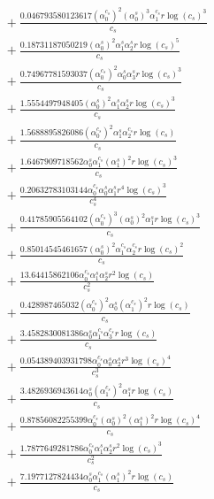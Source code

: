 \documentclass[10pt]{article}
\begin{document}
\begin{align*}
&{}  + \frac{0.046793580123617 \left(\alpha_{0}^{c_s}\right)^{2} \left(\alpha_{0}^s\right)^{3} \alpha_{1}^{c_s} r \log{\left(c_{s} \right)}^{3}}{c_{s}} \\
&{}  + \frac{0.18731187050219 \left(\alpha_{0}^s\right)^{2} \alpha_{1}^s \alpha_{2}^s r \log{\left(c_{s} \right)}^{5}}{c_{s}} \\
&{}  + \frac{0.74967781593037 \left(\alpha_{0}^{c_s}\right)^{2} \alpha_{0}^s \alpha_{3}^s r \log{\left(c_{s} \right)}^{3}}{c_{s}} \\
&{}  + \frac{1.5554497948405 \left(\alpha_{0}^s\right)^{2} \alpha_{1}^s \alpha_{2}^s r \log{\left(c_{s} \right)}^{3}}{c_{s}} \\
&{}  + \frac{1.5688895826086 \left(\alpha_{0}^{c_s}\right)^{2} \alpha_{1}^s \alpha_{2}^{c_s} r \log{\left(c_{s} \right)}}{c_{s}} \\
&{}  + \frac{1.6467909718562 \alpha_{0}^s \alpha_{1}^{c_s} \left(\alpha_{1}^s\right)^{2} r \log{\left(c_{s} \right)}^{3}}{c_{s}} \\
&{}  + \frac{0.20632783103144 \alpha_{0}^{c_s} \alpha_{0}^s \alpha_{1}^s r^{4} \log{\left(c_{s} \right)}^{3}}{c_{s}^{4}} \\
&{}  + \frac{0.41785905564102 \left(\alpha_{0}^{c_s}\right)^{3} \left(\alpha_{0}^s\right)^{2} \alpha_{1}^s r \log{\left(c_{s} \right)}^{3}}{c_{s}} \\
&{}  + \frac{0.85014545461657 \left(\alpha_{0}^s\right)^{2} \alpha_{1}^{c_s} \alpha_{2}^{c_s} r \log{\left(c_{s} \right)}^{2}}{c_{s}} \\
&{}  + \frac{13.64415862106 \alpha_{0}^{c_s} \alpha_{1}^s \alpha_{2}^s r^{2} \log{\left(c_{s} \right)}}{c_{s}^{2}} \\
&{}  + \frac{0.428987465032 \left(\alpha_{0}^{c_s}\right)^{2} \alpha_{0}^s \left(\alpha_{1}^{c_s}\right)^{2} r \log{\left(c_{s} \right)}}{c_{s}} \\
&{}  + \frac{3.4582830081386 \alpha_{0}^s \alpha_{1}^{c_s} \alpha_{3}^{c_s} r \log{\left(c_{s} \right)}}{c_{s}} \\
&{}  + \frac{0.054389403931798 \alpha_{0}^{c_s} \alpha_{0}^s \alpha_{2}^s r^{3} \log{\left(c_{s} \right)}^{4}}{c_{s}^{3}} \\
&{}  + \frac{3.4826936943614 \alpha_{0}^s \left(\alpha_{1}^{c_s}\right)^{2} \alpha_{1}^s r \log{\left(c_{s} \right)}}{c_{s}} \\
&{}  + \frac{0.87856082255399 \alpha_{0}^{c_s} \left(\alpha_{0}^s\right)^{2} \left(\alpha_{1}^s\right)^{2} r \log{\left(c_{s} \right)}^{4}}{c_{s}} \\
&{}  + \frac{1.7877649281786 \alpha_{0}^{c_s} \alpha_{1}^s \alpha_{2}^s r^{2} \log{\left(c_{s} \right)}^{3}}{c_{s}^{2}} \\
&{}  + \frac{7.1977127824434 \alpha_{0}^s \alpha_{1}^{c_s} \left(\alpha_{1}^s\right)^{2} r \log{\left(c_{s} \right)}}{c_{s}}
\end{align*}
\end{document}
